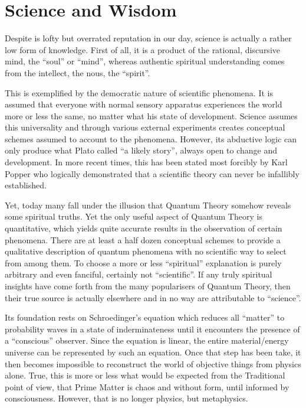 \section{Science and Wisdom}

Despite is lofty but overrated reputation in our day, science is actually a rather low form of knowledge. First of all, it is a product of the rational, discursive mind, the ``soul'' or ``mind'', whereas authentic spiritual understanding comes from the intellect, the nous, the ``spirit''.

This is exemplified by the democratic nature of scientific phenomena. It is assumed that everyone with normal sensory apparatus experiences the world more or less the same, no matter what his state of development. Science assumes this universality and through various external experiments creates conceptual schemes assumed to account to the phenomena. However, its abductive logic can only produce what Plato called ``a likely story'', always open to change and development. In more recent times, this has been stated most forcibly by Karl Popper who logically demonstrated that a scientific theory can never be infallibly established.

Yet, today many fall under the illusion that Quantum Theory somehow reveals some spiritual truths. Yet the only useful aspect of Quantum Theory is quantitative, which yields quite accurate results in the observation of certain phenomena. There are at least a half dozen conceptual schemes to provide a qualitative description of quantum phenomena with no scientific way to select from among them. To choose a more or less ``spiritual'' explanation is purely arbitrary and even fanciful, certainly not ``scientific''. If any truly spiritual insights have come forth from the many popularisers of Quantum Theory, then their true source is actually elsewhere and in no way are attributable to ``science''.

Its foundation rests on Schroedinger's equation which reduces all ``matter'' to probability waves in a state of inderminateness until it encounters the presence of a ``conscious'' observer. Since the equation is linear, the entire material/energy universe can be represented by such an equation. Once that step has been take, it then becomes impossible to reconstruct the world of objective things from physics alone. True, this is more or less what would be expected from the Traditional point of view, that Prime Matter is chaos and without form, until informed by consciousness. However, that is no longer physics, but metaphysics.

